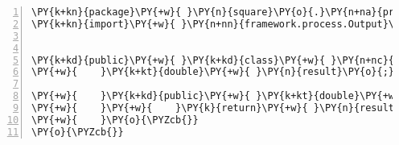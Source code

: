 \begin{Verbatim}[commandchars=\\\{\},numbers=left,firstnumber=1,stepnumber=1,frame=single,fontsize=\small]
\PY{k+kn}{package}\PY{+w}{ }\PY{n}{square}\PY{o}{.}\PY{n+na}{process}\PY{o}{;}
\PY{k+kn}{import}\PY{+w}{ }\PY{n+nn}{framework.process.Output}\PY{o}{;}


\PY{k+kd}{public}\PY{+w}{ }\PY{k+kd}{class}\PY{+w}{ }\PY{n+nc}{SquaredValue}\PY{+w}{ }\PY{k+kd}{implements}\PY{+w}{ }\PY{n}{Output}\PY{+w}{ }\PY{o}{\PYZob{}}
\PY{+w}{    }\PY{k+kt}{double}\PY{+w}{ }\PY{n}{result}\PY{o}{;}

\PY{+w}{    }\PY{k+kd}{public}\PY{+w}{ }\PY{k+kt}{double}\PY{+w}{ }\PY{n+nf}{getResult}\PY{o}{(}\PY{o}{)}\PY{+w}{ }\PY{o}{\PYZob{}}
\PY{+w}{    }\PY{+w}{    }\PY{k}{return}\PY{+w}{ }\PY{n}{result}\PY{o}{;}
\PY{+w}{    }\PY{o}{\PYZcb{}}
\PY{o}{\PYZcb{}}
\end{Verbatim}
